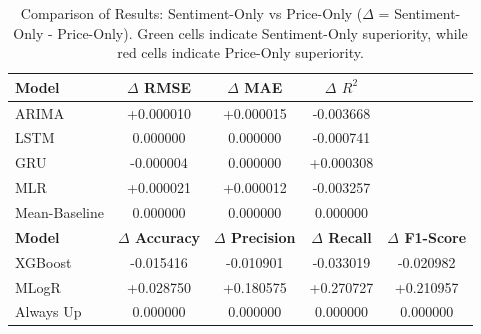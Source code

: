 \documentclass[Master,english,IEEE]{twbook}
\begin{document}
\begin{table}[H]
    \centering
    \small %
    \setlength{\tabcolsep}{4pt} %
    \begin{tabular}{|lcccc|}
        \hline
        \textbf{Model} & \textbf{$\Delta$ RMSE} & \textbf{$\Delta$ MAE} & \textbf{$\Delta$ $R^2$} & \\
        \hline
        ARIMA          & \cellcolor{red!50}+0.000010 & \cellcolor{red!50}+0.000015 & \cellcolor{red!50}-0.003668 & \\
        LSTM           & 0.000000                     & 0.000000                     & \cellcolor{red!50}-0.000741 & \\
        GRU            & \cellcolor{green!50}-0.000004 & 0.000000                     & \cellcolor{green!50}+0.000308 & \\
        MLR            & \cellcolor{red!50}+0.000021 & \cellcolor{red!50}+0.000012 & \cellcolor{red!50}-0.003257 & \\
        Mean-Baseline  & 0.000000                     & 0.000000                     & 0.000000                     & \\
        \hline
        \textbf{Model} & \textbf{$\Delta$ Accuracy} & \textbf{$\Delta$ Precision} & \textbf{$\Delta$ Recall} & \textbf{$\Delta$ F1-Score} \\
        \hline
        XGBoost        & \cellcolor{red!50}-0.015416 & \cellcolor{red!50}-0.010901 & \cellcolor{red!50}-0.033019 & \cellcolor{red!50}-0.020982 \\
        MLogR          & \cellcolor{green!50}+0.028750 & \cellcolor{green!50}+0.180575 & \cellcolor{green!50}+0.270727 & \cellcolor{green!50}+0.210957 \\
        Always Up      & 0.000000                     & 0.000000                     & 0.000000                     & 0.000000                     \\
        \hline
    \end{tabular}
    \caption{Comparison of Results: Sentiment-Only vs Price-Only ($\Delta$ = Sentiment-Only - Price-Only). Green cells indicate Sentiment-Only superiority, while red cells indicate Price-Only superiority.}
    \label{tab:sentiment_vs_price_delta}
\end{table}
\end{document}
